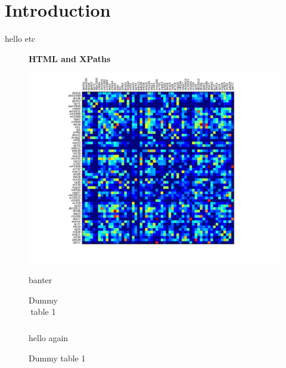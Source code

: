 
\chapter{Introduction}
hello etc
\begin{figure}[H]
    \centering
    \textbf{HTML and XPaths}\par\medskip
    \includegraphics[scale=0.3]{Example/scaled_community_collaboration.png}
    \caption{Tree representation of HTML code\label{fig:HTMLTREE}}
    banter
\begin{table}[H]
\begin{center}
\begin{tabular}{|c|c|}
\end{tabular}
\caption{Dummy table 1}
\end{center}
\label{tab:dum1}
\end{table}
hello again \cite{einstein}

\end{figure}
